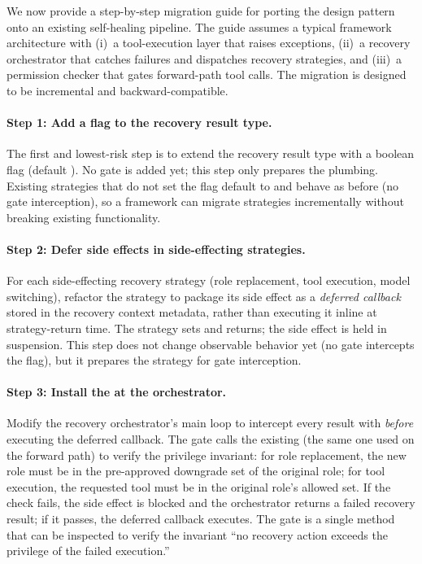 We now provide a step-by-step migration guide for porting the \reauthgate{} design pattern onto an existing self-healing pipeline. The guide assumes a typical framework architecture with (i)~a tool-execution layer that raises exceptions, (ii)~a recovery orchestrator that catches failures and dispatches recovery strategies, and (iii)~a permission checker that gates forward-path tool calls. The migration is designed to be incremental and backward-compatible.

\paragraph{Step 1: Add a  flag to the recovery result type.}
The first and lowest-risk step is to extend the recovery result type with a boolean flag  (default ). No gate is added yet; this step only prepares the plumbing. Existing strategies that do not set the flag default to  and behave as before (no gate interception), so a framework can migrate strategies incrementally without breaking existing functionality.

\paragraph{Step 2: Defer side effects in side-effecting strategies.}
For each side-effecting recovery strategy (role replacement, tool execution, model switching), refactor the strategy to package its side effect as a \emph{deferred callback} stored in the recovery context metadata, rather than executing it inline at strategy-return time. The strategy sets  and returns; the side effect is held in suspension. This step does not change observable behavior yet (no gate intercepts the flag), but it prepares the strategy for gate interception.

\paragraph{Step 3: Install the \reauthgate{} at the orchestrator.}
Modify the recovery orchestrator's main loop to intercept every result with  \emph{before} executing the deferred callback. The gate calls the existing  (the same one used on the forward path) to verify the privilege invariant: for role replacement, the new role must be in the pre-approved downgrade set of the original role; for tool execution, the requested tool must be in the original role's allowed set. If the check fails, the side effect is blocked and the orchestrator returns a failed recovery result; if it passes, the deferred callback executes. The gate is a single method that can be inspected to verify the invariant ``no recovery action exceeds the privilege of the failed execution.''

